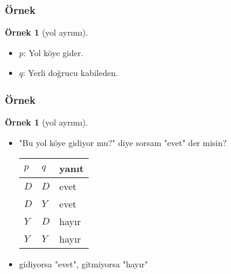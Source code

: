 \documentclass[dvipsnames]{beamer}
\theoremstyle{definition}
\theoremstyle{example}
\newtheorem{ornek}[theorem]{Örnek}
\theoremstyle{plain}
\begin{document}
\begin{frame}
  \frametitle{Örnek}

  \begin{ornek}[yol ayrımı]
    \begin{itemize}
      \item $p$: Yol köye gider.
      \item $q$: Yerli doğrucu kabileden.
    \end{itemize}
  \end{ornek}
\end{frame}

\begin{frame}
  \frametitle{Örnek}

  \begin{ornek}[yol ayrımı]
    \begin{itemize}
      \item "Bu yol köye gidiyor mu?" diye sorsam "evet" der misin?

      \pause
      \medskip
      \begin{table}
        \begin{tabular}{|l|l||l|}\hline
          $p$ & $q$ & yanıt\\\hline\hline
          $D$ & $D$ & evet \\\hline
          $D$ & $Y$ & evet \\\hline
          $Y$ & $D$ & hayır\\\hline
          $Y$ & $Y$ & hayır\\\hline
        \end{tabular}
      \end{table}

      \pause
      \medskip
      \item gidiyorsa "evet", gitmiyorsa "hayır"
    \end{itemize}
  \end{ornek}
\end{frame}
\end{document}
